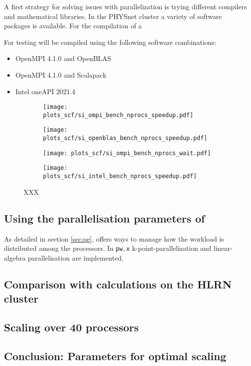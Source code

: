 \documentclass[main.tex]{subfiles}
\begin{document}
A first strategy for solving issues with parallelization is trying different compilers and mathematical libraries.
In the PHYSnet cluster a variety of software packages is available.
For the compilation of \QE a 

For testing \QE will be compiled using the following software combinations:
\begin{itemize}
    \item OpenMPI 4.1.0 and OpenBLAS
    \item OpenMPI 4.1.0 and Scalapack
    \item Intel oneAPI 2021.4
\end{itemize}

\begin{figure}[htbp]
\begin{subfigure}[b]{0.4\textwidth}
    \centering
    \texttt{[image: plots\_scf/si\_ompi\_bench\_nprocs\_speedup.pdf]}
\end{subfigure}
\begin{subfigure}[b]{0.4\textwidth}
    \centering
    \texttt{[image: plots\_scf/si\_openblas\_bench\_nprocs\_speedup.pdf]}
\end{subfigure}
\begin{subfigure}[b]{0.4\textwidth}
    \centering
    \texttt{[image: plots\_scf/si\_ompi\_bench\_nprocs\_wait.pdf]}
\end{subfigure}
\begin{subfigure}[b]{0.4\textwidth}
    \centering
    \texttt{[image: plots\_scf/si\_intel\_bench\_nprocs\_speedup.pdf]}
\end{subfigure}
\caption{XXX}
\label{fig:scaling_compilers_nprocs}
\end{figure}


\subsection{Using the parallelisation parameters of \QE}

As detailed in section \ref{sec:qe}, \QE offers ways to manage how the workload is distributed among the processors.
In \texttt{pw.x} k-point-parallelization and linear-algebra parallelisation are implemented.

\subsection{Comparison with calculations on the HLRN cluster}

\subsection{Scaling over 40 processors}

\subsection{Conclusion: Parameters for optimal scaling}
\end{document}
